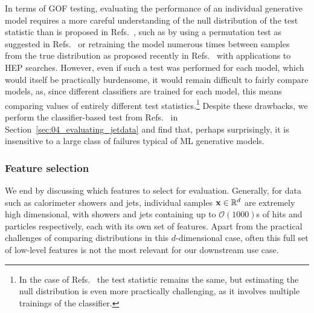 In terms of GOF testing, evaluating the performance of an individual generative model requires a more careful understanding of the null distribution of the test statistic than is proposed in Refs.~\cite{krause_caloflow, calochallenge}, such as by using a permutation test as suggested in Refs.~\cite{friedman_gof, liu_deepkernels} or retraining the model numerous times between samples from the true distribution as proposed recently in Refs.~\cite{dagnolo_nplm, dagnolo_lmnp} with applications to HEP searches.
However, even if such a test was performed for each model, which would itself be practically burdensome, it would remain difficult to fairly compare models, as, since different classifiers are trained for each model, this means comparing values of entirely different test statistics.\footnote{In the case of Refs.~\cite{dagnolo_nplm, dagnolo_lmnp} the test statistic remains the same, but estimating the null distribution is even more practically challenging, as it involves multiple trainings of the classifier.}
Despite these drawbacks, we perform the classifier-based test from Refs.~\cite{krause_caloflow, calochallenge} in Section~\ref{sec:04_evaluating_jetdata} and find that, perhaps surprisingly, it is insensitive to a large class of failures typical of ML generative models.


\subsubsection{Feature selection}
\label{sec:04_evaluating_feature_selection}

We end by discussing which features to select for evaluation.
Generally, for data such as calorimeter showers and jets, individual samples $\mathbf{x} \in \mathbb R^d$ are extremely high dimensional, with showers and jets containing up to $\mathcal{O}(1000)$s of hits and particles respectively, each with its own set of features.
Apart from the practical challenges of comparing distributions in this $d$-dimensional case, often this full set of low-level features is not the most relevant for our downstream use case.


